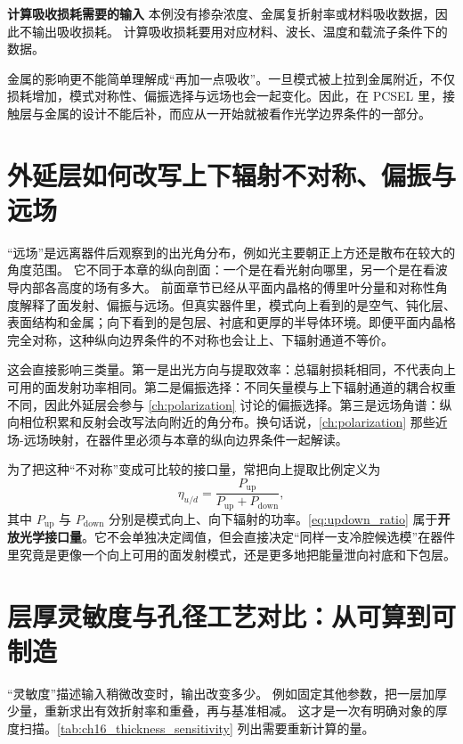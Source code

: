 \begin{notebox}
\textbf{计算吸收损耗需要的输入}
本例没有掺杂浓度、金属复折射率或材料吸收数据，因此不输出吸收损耗。
计算吸收损耗要用对应材料、波长、温度和载流子条件下的数据。
\end{notebox}

金属的影响更不能简单理解成“再加一点吸收”。一旦模式被上拉到金属附近，不仅损耗增加，模式对称性、偏振选择与远场也会一起变化。因此，在 PCSEL 里，接触层与金属的设计不能后补，而应从一开始就被看作光学边界条件的一部分。

\section{外延层如何改写上下辐射不对称、偏振与远场}
“远场”是远离器件后观察到的出光角分布，例如光主要朝正上方还是散布在较大的角度范围。
它不同于本章的纵向剖面：一个是在看光射向哪里，另一个是在看波导内部各高度的场有多大。
前面章节已经从平面内晶格的傅里叶分量和对称性角度解释了面发射、偏振与远场。但真实器件里，模式向上看到的是空气、钝化层、表面结构和金属；向下看到的是包层、衬底和更厚的半导体环境。即便平面内晶格完全对称，这种纵向边界条件的不对称也会让上、下辐射通道不等价。

这会直接影响三类量。第一是出光方向与提取效率：总辐射损耗相同，不代表向上可用的面发射功率相同。第二是偏振选择：不同矢量模与上下辐射通道的耦合权重不同，因此外延层会参与 \cref{ch:polarization} 讨论的偏振选择。第三是远场角谱：纵向相位积累和反射会改写法向附近的角分布。换句话说，\cref{ch:polarization} 那些近场-远场映射，在器件里必须与本章的纵向边界条件一起解读。

为了把这种“不对称”变成可比较的接口量，常把向上提取比例定义为
\begin{equation}
\eta_{u/d} =
\frac{P_{\mathrm{up}}}{P_{\mathrm{up}}+P_{\mathrm{down}}},
\label{eq:updown_ratio}
\end{equation}
其中 $P_{\mathrm{up}}$ 与 $P_{\mathrm{down}}$ 分别是模式向上、向下辐射的功率。\cref{eq:updown_ratio} 属于\textbf{开放光学接口量}。它不会单独决定阈值，但会直接决定“同样一支冷腔候选模”在器件里究竟是更像一个向上可用的面发射模式，还是更多地把能量泄向衬底和下包层。

\section{层厚灵敏度与孔径工艺对比：从可算到可制造}
“灵敏度”描述输入稍微改变时，输出改变多少。
例如固定其他参数，把一层加厚少量，重新求出有效折射率和重叠，再与基准相减。
这才是一次有明确对象的厚度扫描。\cref{tab:ch16_thickness_sensitivity} 列出需要重新计算的量。

